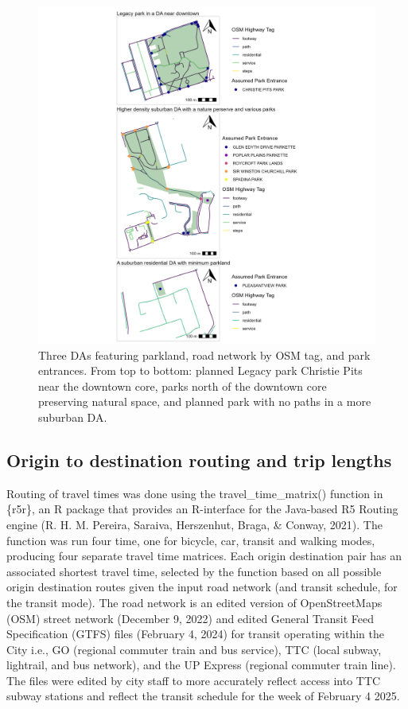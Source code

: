 \documentclass[
11pt, %
oneside, %
english, %
singlespacing, %
]{macthesis} %
\begin{document}
\begin{figure}

{\centering \includegraphics[width=6in]{./data/figures/chp3-park_entrance_example_plot} 

}

\caption{\label{fig:chp3-park_entrance_example_plot} Three DAs featuring parkland, road network by OSM tag, and park entrances. From top to bottom: planned Legacy park Christie Pits near the downtown core, parks north of the downtown core preserving natural space, and planned park with no paths in a more suburban DA.}\label{fig:unnamed-chunk-47}
\end{figure}

\subsection{Origin to destination routing and trip lengths}\label{origin-to-destination-routing-and-trip-lengths}

Routing of travel times was done using the travel\_time\_matrix() function in \{r5r\}, an R package that provides an R-interface for the Java-based R5 Routing engine (R. H. M. Pereira, Saraiva, Herszenhut, Braga, \& Conway, 2021). The function was run four time, one for bicycle, car, transit and walking modes, producing four separate travel time matrices. Each origin destination pair has an associated shortest travel time, selected by the function based on all possible origin destination routes given the input road network (and transit schedule, for the transit mode). The road network is an edited version of OpenStreetMaps (OSM) street network (December 9, 2022) and edited General Transit Feed Specification (GTFS) files (February 4, 2024) for transit operating within the City i.e., GO (regional commuter train and bus service), TTC (local subway, lightrail, and bus network), and the UP Express (regional commuter train line). The files were edited by city staff to more accurately reflect access into TTC subway stations and reflect the transit schedule for the week of February 4 2025.
\end{document}
